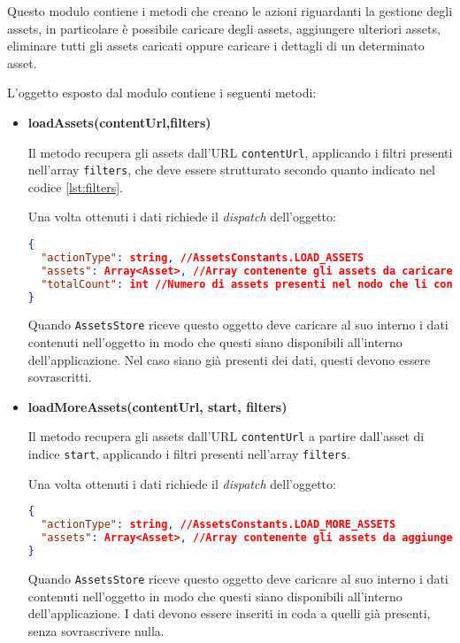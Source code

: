 
Questo modulo contiene i metodi che creano le azioni riguardanti la gestione degli assets, in particolare è possibile caricare degli assets, aggiungere ulteriori assets, eliminare tutti gli assets caricati oppure caricare i dettagli di un determinato asset.

L'oggetto esposto dal modulo contiene i seguenti metodi:
\begin{itemize}
\item \textbf{loadAssets(contentUrl,filters)}

Il metodo recupera gli assets dall'URL \texttt{contentUrl}, applicando i filtri presenti nell'array \texttt{filters}, che deve essere strutturato secondo quanto indicato nel codice \ref{lst:filters}.

Una volta ottenuti i dati richiede il \textit{dispatch} dell'oggetto:
\begin{lstlisting}[language=JSON, caption=Action - load assets]
{
  "actionType": string, //AssetsConstants.LOAD_ASSETS
  "assets": Array<Asset>, //Array contenente gli assets da caricare
  "totalCount": int //Numero di assets presenti nel nodo che li contiene
}
\end{lstlisting}

Quando \texttt{AssetsStore} riceve questo oggetto deve caricare al suo interno i dati contenuti nell'oggetto in modo che questi siano disponibili all'interno dell'applicazione. Nel caso siano già presenti dei dati, questi devono essere sovrascritti.

\item \textbf{loadMoreAssets(contentUrl, start, filters)}

Il metodo recupera gli assets dall'URL \texttt{contentUrl} a partire dall'asset di indice \texttt{start}, applicando i filtri presenti nell'array \texttt{filters}.

Una volta ottenuti i dati richiede il \textit{dispatch} dell'oggetto:
\begin{lstlisting}[language=JSON, caption=Action - load more assets]
{
  "actionType": string, //AssetsConstants.LOAD_MORE_ASSETS
  "assets": Array<Asset>, //Array contenente gli assets da aggiungere in coda agli assets attuali
}
\end{lstlisting}

Quando \texttt{AssetsStore} riceve questo oggetto deve caricare al suo interno i dati contenuti nell'oggetto in modo che questi siano disponibili all'interno dell'applicazione.
I dati devono essere inseriti in coda a quelli già presenti, senza sovrascrivere nulla.


\end{itemize}
